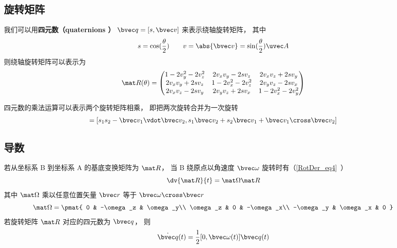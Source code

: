 \subsection{旋转矩阵}
我们可以用\textbf{四元数（quaternions ）} $\bvec q = [s, \bvec v]$ 来表示绕轴旋转矩阵， 其中
\begin{equation}
s = \cos(\frac{\theta}{2}) \qquad v = \abs{\bvec v} = \sin(\frac{\theta}{2})\uvec A
\end{equation}
则绕轴旋转矩阵可以表示为
\begin{equation}\label{QuatN_eq2}
\mat R(\theta) =
\begin{pmatrix}
1 - 2v_y^2 - 2v_z^2 & 2v_xv_y - 2sv_z  & 2v_x v_z + 2s v_y\\
2v_x v_y + 2sv_z & 1 - 2v_x^2 - 2v_z^2 & 2v_y v_z - 2s v_x\\
2v_x v_z - 2s v_y & 2v_y v_z + 2s v_x & 1 - 2v_x^2 - 2v_y^2
\end{pmatrix}
\end{equation}

四元数的乘法运算可以表示两个旋转矩阵相乘， 即把两次旋转合并为一次旋转
\begin{equation}
[s_1, \bvec v_1] [s_2, \bvec v_2] = [s_1 s_2 - \bvec v_1 \vdot \bvec v_2, s_1 \bvec v_2 + s_2 \bvec v_1 + \bvec v_1 \cross \bvec v_2]
\end{equation}

\subsection{导数}
若从坐标系 B 到坐标系 A 的基底变换矩阵为 $\mat R$， 当 B 绕原点以角速度 $\bvec \omega$ 旋转时有（\autoref{RotDer_eq4}~）
\begin{equation}
\dv{\mat R}{t} = \mat \Omega \mat R
\end{equation}
其中 $\mat\Omega$ 乘以任意位置矢量 $\bvec r$ 等于 $\bvec \omega \cross \bvec r$
\begin{equation}
\mat \Omega = \pmat{
0 & -\omega_z & \omega_y\\
\omega_z & 0 & -\omega_x\\
-\omega_y & \omega_x & 0
}\end{equation}
若旋转矩阵 $\mat R$ 对应的四元数为 $\bvec q$， 则
\begin{equation}\label{QuatN_eq1}
\dot {\bvec q}(t) = \frac12 [0, \bvec \omega(t)] \bvec q(t)
\end{equation}

